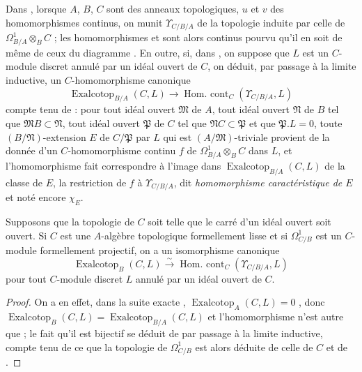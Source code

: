\begin{env}[20.7.10]
\label{0.20.7.10-fr}
Dans , lorsque $A$, $B$, $C$ sont des anneaux topologiques,
$u$ et $v$ des homomorphismes continus, on munit $\Upsilon_{C/B/A}$ de la
topologie induite par celle de $\Omega^1_{B/A}\otimes_B C$ ; les
homomorphismes  et  sont alors
continus pourvu qu'il en soit de même de ceux du diagramme
. En outre, si, dans , on suppose que
$L$ est un $C$-module discret annulé par un idéal ouvert de $C$, on déduit,
par passage à la limite inductive, un $C$-homomorphisme canonique
\begin{equation}
\tag{20.7.10.1}
\label{0.20.7.10.1-fr}
  \operatorname{Exalcotop}_{B/A}(C,L)\to
  \operatorname{Hom.\ cont}_C(\Upsilon_{C/B/A},L)
\end{equation}
compte tenu de  : pour tout idéal ouvert
$\mathfrak{M}$ de $A$, tout idéal ouvert $\mathfrak{N}$ de $B$ tel que
$\mathfrak{M}B\subset\mathfrak{N}$, tout idéal ouvert $\mathfrak{P}$ de $C$
tel que $\mathfrak{N}C\subset\mathfrak{P}$ et que $\mathfrak{P}.L=0$, toute
$(B/\mathfrak{N})$-extension $E$ de $C/\mathfrak{P}$ par $L$ qui est
$(A/\mathfrak{M})$-triviale provient de la donnée d'un $C$-homomorphisme
continu $f$ de $\Omega^1_{B/A}\otimes_B C$ dans $L$, et l'homomorphisme
 fait correspondre à l'image dans
$\operatorname{Exalcotop}_{B/A}(C,L)$ de la classe de $E$, la restriction de
$f$ à $\Upsilon_{C/B/A}$, dit \emph{homomorphisme caractéristique de $E$} et
noté encore $\chi_E$.
\end{env}

\begin{proposition}[20.7.11]
\label{0.20.7.11-fr}
Supposons que la topologie de $C$ soit telle que le carré d'un idéal ouvert
soit ouvert. Si $C$ est une $A$-algèbre topologique formellement lisse et si
$\Omega^1_{C/B}$ est un $C$-module formellement projectif, on a un
isomorphisme canonique
\begin{equation}
\tag{20.7.11.1}
\label{0.20.7.11.1-fr}
  \operatorname{Exalcotop}_B(C,L)\xrightarrow{\sim}
  \operatorname{Hom.\ cont}_C(\Upsilon_{C/B/A},L)
\end{equation}
pour tout $C$-module discret $L$ annulé par un idéal ouvert de $C$.
\end{proposition}

\begin{proof}
On a en effet, dans la suite exacte ,
$\operatorname{Exalcotop}_A(C,L)=0$ , donc
$\operatorname{Exalcotop}_B(C,L)=\operatorname{Exalcotop}_{B/A}(C,L)$ et
l'homomorphisme  n'est autre que
 ; le fait qu'il est bijectif se déduit de
 par passage à la limite inductive, compte tenu de ce que
la topologie de $\Omega^1_{C/B}$ est alors déduite de celle de $C$
 et de .
\end{proof}

